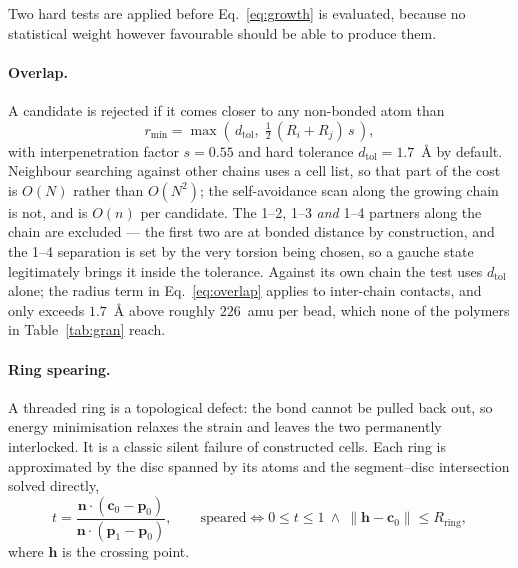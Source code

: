 \documentclass[11pt,a4paper]{article}
\begin{document}
Two hard tests are applied before Eq.~\eqref{eq:growth} is evaluated, because
no statistical weight however favourable should be able to produce them.

\paragraph{Overlap.} A candidate is rejected if it comes closer to any
non-bonded atom than
\begin{equation}
  r_{\min} = \max\!\left(\,d_{\text{tol}},\;
  \tfrac{1}{2}\,(R_i + R_j)\,s\,\right),
  \label{eq:overlap}
\end{equation}
with interpenetration factor $s = 0.55$ and hard tolerance
$d_{\text{tol}} = 1.7$~\AA{} by default. Neighbour searching against other
chains uses a cell list, so that part of the cost is $O(N)$ rather than
$O(N^2)$; the self-avoidance scan along the growing chain is not, and is
$O(n)$ per candidate. The 1--2, 1--3 \emph{and} 1--4 partners along the chain
are excluded --- the first two are at bonded distance by construction, and the
1--4 separation is set by the very torsion being chosen, so a gauche state
legitimately brings it inside the tolerance. Against its own chain the test
uses $d_{\text{tol}}$ alone; the radius term in Eq.~\eqref{eq:overlap} applies
to inter-chain contacts, and only exceeds $1.7$~\AA{} above roughly
$226$~amu per bead, which none of the polymers in Table~\ref{tab:gran} reach.

\paragraph{Ring spearing.} A threaded ring is a topological defect: the bond
cannot be pulled back out, so energy minimisation relaxes the strain and
leaves the two permanently interlocked. It is a classic silent failure of
constructed cells. Each ring is approximated by the disc spanned by its atoms
and the segment--disc intersection solved directly,
\begin{equation}
  t = \frac{\mathbf{n}\cdot(\mathbf{c}_0 - \mathbf{p}_0)}
           {\mathbf{n}\cdot(\mathbf{p}_1 - \mathbf{p}_0)},
  \qquad
  \text{speared} \iff
  0 \le t \le 1 \ \wedge\
  \lVert \mathbf{h} - \mathbf{c}_0 \rVert \le R_{\text{ring}},
  \label{eq:spear}
\end{equation}
where $\mathbf{h}$ is the crossing point.
\end{document}
